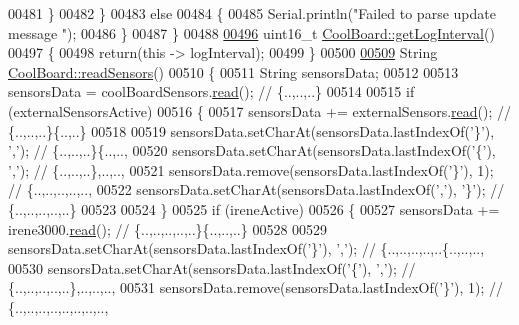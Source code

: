 \begin{DoxyCode}
00481         \}
00482     \}
00483     \textcolor{keywordflow}{else}
00484     \{
00485         Serial.println(\textcolor{stringliteral}{"Failed to parse update message "});  
00486     \}       
00487 \}
00488 
\hyperlink{class_cool_board_aaa24480b273fc095a1356a589c333781}{00496} uint16\_t \hyperlink{class_cool_board_aaa24480b273fc095a1356a589c333781}{CoolBoard::getLogInterval}()
00497 \{
00498     \textcolor{keywordflow}{return}(\textcolor{keyword}{this} -> logInterval);
00499 \}
00500 
\hyperlink{class_cool_board_ad03abdce2e65f520bbf2cff0f2d083cf}{00509} String \hyperlink{class_cool_board_ad03abdce2e65f520bbf2cff0f2d083cf}{CoolBoard::readSensors}()
00510 \{
00511     String sensorsData;
00512 
00513     sensorsData = coolBoardSensors.\hyperlink{class_cool_board_sensors_a91badb2539d91fda8679f2a597874c48}{read}(); \textcolor{comment}{// \{..,..,..\}}
00514     
00515     \textcolor{keywordflow}{if} (externalSensorsActive)
00516     \{
00517         sensorsData += externalSensors.\hyperlink{class_external_sensors_a53177b81eca3be89508b5511ddcd00fc}{read}(); \textcolor{comment}{// \{..,..,..\}\{..,..\}}
00518 
00519         sensorsData.setCharAt(sensorsData.lastIndexOf(\textcolor{charliteral}{'\}'}), \textcolor{charliteral}{','}); \textcolor{comment}{// \{..,..,..\}\{..,..,}
00520         sensorsData.setCharAt(sensorsData.lastIndexOf(\textcolor{charliteral}{'\{'}), \textcolor{charliteral}{','}); \textcolor{comment}{// \{..,..,..\},..,..,}
00521         sensorsData.remove(sensorsData.lastIndexOf(\textcolor{charliteral}{'\}'}), 1); \textcolor{comment}{// \{..,..,..,..,..,}
00522         sensorsData.setCharAt(sensorsData.lastIndexOf(\textcolor{charliteral}{','}), \textcolor{charliteral}{'\}'}); \textcolor{comment}{// \{..,..,..,..,..\}}
00523 
00524     \}
00525     \textcolor{keywordflow}{if} (ireneActive)
00526     \{
00527         sensorsData += irene3000.\hyperlink{class_irene3000_a852a170feea994ea1df01c6b245b5d9a}{read}(); \textcolor{comment}{// \{..,..,..,..,..\}\{..,..,..\}}
00528 
00529         sensorsData.setCharAt(sensorsData.lastIndexOf(\textcolor{charliteral}{'\}'}), \textcolor{charliteral}{','}); \textcolor{comment}{// \{..,..,..,..,..\{..,..,..,}
00530         sensorsData.setCharAt(sensorsData.lastIndexOf(\textcolor{charliteral}{'\{'}), \textcolor{charliteral}{','}); \textcolor{comment}{// \{..,..,..,..,..\},..,..,..,}
00531         sensorsData.remove(sensorsData.lastIndexOf(\textcolor{charliteral}{'\}'}), 1); \textcolor{comment}{// \{..,..,..,..,..,..,..,..,}

\end{DoxyCode}
